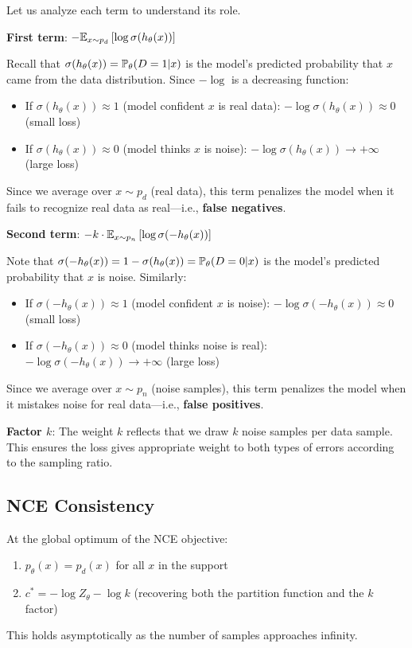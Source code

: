 \begin{notechapter}
\begin{remark}
Let us analyze each term to understand its role.

\textbf{First term}: $-\mathbb{E}_{x \sim p_d}\left[\log \sigma(h_\theta(x))\right]$

Recall that $\sigma(h_\theta(x)) = \mathbb{P}_\theta(D=1|x)$ is the model's predicted probability that $x$ came from the data distribution. Since $-\log$ is a decreasing function:
\begin{itemize}
    \item If $\sigma(h_\theta(x)) \approx 1$ (model confident $x$ is real data): $-\log \sigma(h_\theta(x)) \approx 0$ (small loss)
    \item If $\sigma(h_\theta(x)) \approx 0$ (model thinks $x$ is noise): $-\log \sigma(h_\theta(x)) \to +\infty$ (large loss)
\end{itemize}
Since we average over $x \sim p_d$ (real data), this term penalizes the model when it fails to recognize real data as real---i.e., \textbf{false negatives}.

\textbf{Second term}: $-k \cdot \mathbb{E}_{x \sim p_n}\left[\log \sigma(-h_\theta(x))\right]$

Note that $\sigma(-h_\theta(x)) = 1 - \sigma(h_\theta(x)) = \mathbb{P}_\theta(D=0|x)$ is the model's predicted probability that $x$ is noise. Similarly:
\begin{itemize}
    \item If $\sigma(-h_\theta(x)) \approx 1$ (model confident $x$ is noise): $-\log \sigma(-h_\theta(x)) \approx 0$ (small loss)
    \item If $\sigma(-h_\theta(x)) \approx 0$ (model thinks noise is real): $-\log \sigma(-h_\theta(x)) \to +\infty$ (large loss)
\end{itemize}
Since we average over $x \sim p_n$ (noise samples), this term penalizes the model when it mistakes noise for real data---i.e., \textbf{false positives}.

\textbf{Factor $k$}: The weight $k$ reflects that we draw $k$ noise samples per data sample. This ensures the loss gives appropriate weight to both types of errors according to the sampling ratio.
\end{remark}

\subsection{NCE Consistency}

\begin{theorem}
\label{contrastive-rigorous:thm:nce_consistency}
At the global optimum of the NCE objective:
\begin{enumerate}[label=(\roman*)]
    \item $p_\theta(x) = p_d(x)$ for all $x$ in the support
    \item $c^* = -\log Z_\theta - \log k$ (recovering both the partition function and the $k$ factor)
\end{enumerate}
This holds asymptotically as the number of samples approaches infinity.
\end{theorem}


\end{notechapter}
